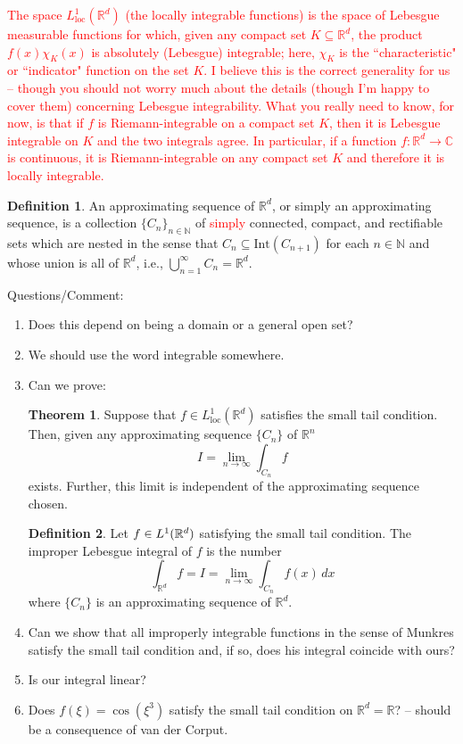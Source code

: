 \documentclass{article}
\theoremstyle{definition}
\newtheorem{defn}{Definition}[section]
\newtheorem{thm}{Theorem}[section]
\begin{document}
\textcolor{red}{The space $L^1_{\text{loc}}(\mathbb{R}^d)$ (the locally integrable functions) is the space of Lebesgue measurable functions for which, given any compact set $K\subseteq \mathbb{R}^d$, the product $f(x)\chi_{K}(x)$ is absolutely (Lebesgue) integrable; here, $\chi_K$ is the ``characteristic" or ``indicator" function on the set $K$. I believe this is the correct generality for us -- though you should not worry much about the details (though I'm happy to cover them) concerning Lebesgue integrability. What you really need to know, for now, is that if $f$ is Riemann-integrable on a compact set $K$, then it is Lebesgue integrable on $K$ and the two integrals agree. In particular, if a function $f:\mathbb{R}^d\to\mathbb{C}$ is continuous, it is Riemann-integrable on any compact set $K$ and therefore it is locally integrable.}

\begin{defn}
An approximating sequence of $\mathbb{R}^d$, or simply an approximating sequence, is a collection $\{C_n\}_{n\in\mathbb{N}}$ of \textcolor{red}{simply} connected, compact, and rectifiable sets which are nested in the sense that $C_n\subseteq \mbox{Int}(C_{n+1})$ for each $n\in\mathbb{N}$ and whose union is all of $\mathbb{R}^d$, i.e., $\bigcup_{n=1}^\infty C_n=\mathbb{R}^d$.
\end{defn}
Questions/Comment:

\begin{enumerate}
\item Does this depend on being a domain or a general open set?
\item We should use the word integrable somewhere. 
\item Can we prove: 
\begin{thm}
Suppose that $f\in L^1_{\text{loc}}(\mathbb{R}^d)$ satisfies the small tail condition. Then, given any approximating sequence $\{C_n\}$ of $\mathbb{R}^n$
\begin{equation*}
I=\lim_{n\to\infty}\int_{C_n} f
\end{equation*}
exists. Further, this limit is independent of the approximating sequence chosen.
\end{thm}

\begin{defn}
Let $f\in L^1_{\mbox{\tiny}}(\mathbb{R}^d)$ satisfying the small tail condition. The improper Lebesgue integral of $f$ is the number
\begin{equation*}
\int_{\mathbb{R}^d} f= I=\lim_{n\to\infty}\int_{C_n}f(x)\,dx
\end{equation*}
where $\{C_n\}$ is an approximating sequence of $\mathbb{R}^d$.
\end{defn}

\item Can we show that all improperly integrable functions in the sense of Munkres satisfy the small tail condition and, if so, does his integral coincide with ours?
\item Is our integral linear?
\item Does $f(\xi)=\cos(\xi^3)$ satisfy the small tail condition on $\mathbb{R}^d=\mathbb{R}$? -- should be a consequence of van der Corput. 
\end{enumerate}
\end{document}

